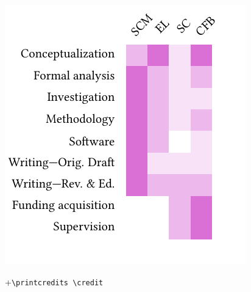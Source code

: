 \documentclass[a4paper,fleqn]{cas-dc}
\begin{document}
\includegraphics[width=0.9\columnwidth]{figures/T-reX_credit_heatmap.pdf}


+\verb+\printcredits +\verb+\credit+ \printcredits


%





%
\end{document}
